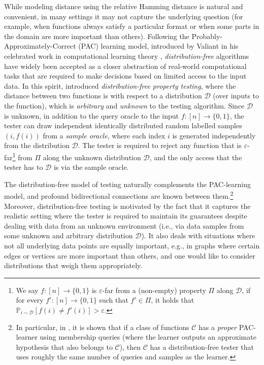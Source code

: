 \documentclass[10pt,a4paper]{article}
\newcommand{\sD}{\mathcal{D}}
\begin{document}
While modeling distance using the relative Hamming distance is natural and convenient, in many settings it may not capture the underlying question (for example, when functions always satisfy a particular format or when some parts in the domain are more important than others). Following the Probably-Approximately-Correct (PAC) learning model, introduced by Valiant in his celebrated work in computational learning theory \cite{Valiant1984}, \textit{distribution-free} algorithms have widely been accepted as a closer abstraction of real-world computational tasks that are required to make decisions based on limited access to the input data. In this spirit, \cite{GGR98} introduced \textit{distribution-free property testing}, where the distance between two functions is with respect to a distribution $\sD$ (over inputs to the function), which is \textit{arbitrary} and \textit{unknown} to the testing algorithm. Since $\sD$ is unknown, in addition to the query oracle to the input $f:[n]\rightarrow \{0,1\}$, the tester can draw independent identically distributed random labelled samples $(i,f(i))$ from a \textit{sample oracle}, where each index $i$ is generated independently from the distribution $\sD$. The tester is required to reject any function that is $\varepsilon$-far\footnote{We say $f:[n]\rightarrow\{0,1\}$ is $\varepsilon$-far from a (non-empty) property $\Pi$ along $\sD$, if for every $f':[n] \rightarrow \{0,1\}$ such that $f' \in \Pi$, it holds that $\mathbb{P}_{i \sim \sD} [f(i) \neq f'(i)]> \varepsilon$.} from $\Pi$ along the unknown distribution $\sD$, and the only access that the tester has to $\sD$ is via the sample oracle. 

The distribution-free model of testing naturally complements the PAC-learning model, and profound bidirectional connections are known between them.\footnote{In particular, in \cite{GGR98}, it is shown that if a class of functions $\mathcal{C}$ has a \textit{proper} PAC-learner using membership queries (where the learner outputs an approximate hypothesis that also belongs to $\mathcal{C}$), then $\mathcal{C}$ has a distribution-free tester that uses roughly the same number of queries and samples as the learner.} Moreover, distribution-free testing is motivated by the fact that it captures the realistic setting where the tester is required to maintain its guarantees despite dealing with data from an unknown environment (i.e., via data samples from some unknown and arbitrary distribution $\sD$). It also deals with situations where not all underlying data points are equally important, e.g., in graphs where certain edges or vertices are more important than others, and one would like to consider distributions that weigh them appropriately.
\end{document}
